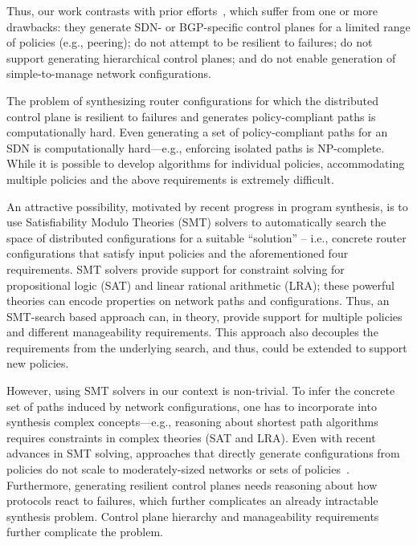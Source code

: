Thus, our work contrasts with prior efforts~\cite{netegg, propane,
  merlin, simple, fattire, netkat, netkatcompiler, sol}, which suffer
from one or more drawbacks: they generate SDN- or BGP-specific
control planes for a limited range of policies (e.g., peering); do not
attempt to be resilient to failures; do not support generating
hierarchical control planes; and do not enable generation of
simple-to-manage network configurations. 

The problem of synthesizing router configurations for which the
distributed control plane is resilient to failures and generates
policy-compliant paths is computationally hard. Even generating a set
of policy-compliant paths for an SDN is computationally hard---e.g.,
enforcing isolated paths is NP-complete. While it is possible to
develop algorithms for individual policies, accommodating multiple
policies and the above requirements is extremely difficult.


An attractive possibility, motivated by recent progress in program
synthesis, is to use
Satisfiability Modulo Theories (SMT) solvers to automatically search
the space of distributed configurations for a suitable ``solution'' --
i.e., concrete router configurations that satisfy input policies and
the aforementioned four requirements. SMT solvers provide support for
constraint solving for propositional logic (SAT) and linear rational
arithmetic (LRA); these powerful theories can  
encode properties on network paths 
and configurations. Thus, an SMT-search based approach can, in theory,
provide support for multiple policies and different manageability requirements. 
This approach also decouples the requirements from the underlying search, 
and thus, could be extended to support new policies. 

However, using SMT solvers in our context is
non-trivial.  To infer the concrete set of paths induced by network
configurations, one has to incorporate into synthesis complex
concepts---e.g., reasoning about shortest path algorithms requires
constraints in complex theories (SAT and LRA).  Even with recent
advances in SMT solving, approaches that directly generate
configurations from policies do not scale to moderately-sized networks
or sets of policies~\cite{synet}. Furthermore, generating resilient
control planes needs reasoning about how protocols react to failures,
which further complicates an already intractable synthesis
problem. Control plane hierarchy and manageability requirements further
complicate the problem.

